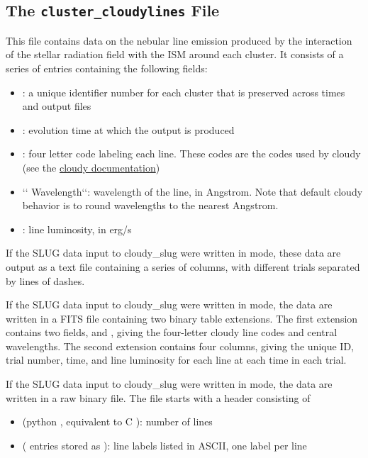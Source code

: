 \documentclass[letterpaper,10pt,english]{sphinxmanual}
\begin{document}
\subsection{The \texttt{cluster\_cloudylines} File}
\label{cloudy:the-cluster-cloudylines-file}
This file contains data on the nebular line emission produced by the
interaction of the stellar radiation field with the ISM around each
cluster. It consists of a series of entries containing the following
fields:
\begin{itemize}
\item {} 
: a unique identifier number for each cluster that is
preserved across times and output files

\item {} 
: evolution time at which the output is produced

\item {} 
: four letter code labeling each line. These codes
are the codes used by cloudy (see the \href{http://nublado.org}{cloudy documentation})

\item {} 
{}`{}` Wavelength{}`{}`: wavelength of the line, in Angstrom. Note that
default cloudy behavior is to round wavelengths to the nearest
Angstrom.

\item {} 
: line luminosity, in erg/s

\end{itemize}

If the SLUG data input to cloudy\_slug were written in  mode,
these data are output as a text file containing a series of columns,
with different trials separated by lines of dashes.

If the SLUG data input to cloudy\_slug were written in  mode,
the data are written in a FITS file containing two binary table
extensions. The first extension contains two fields,  and
, giving the four-letter cloudy line codes and central
wavelengths. The second extension contains four columns, giving the
unique ID, trial number, time, and line luminosity for each line at
each time in each trial.

If the SLUG data input to cloudy\_slug were written in  mode,
the data are written in a raw binary file. The file starts with a
header consisting of
\begin{itemize}
\item {} 
 (python , equivalent to C ): number of lines

\item {} 
 ( entries stored as ): line
labels listed in ASCII, one label per line

\end{itemize}
\end{document}
